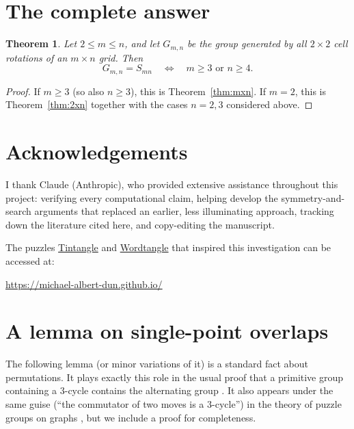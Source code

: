 \documentclass[11pt]{article}
\newtheorem{theorem}{Theorem}
\begin{document}
\section{The complete answer}

\begin{theorem}
Let $2\le m\le n$, and let $G_{m,n}$ be the group generated by all $2\times2$ cell rotations of an $m\times n$ grid. Then
\[
G_{m,n} = S_{mn} \quad\Longleftrightarrow\quad m\ge3 \text{ or } n\ge4.
\]
\end{theorem}
\begin{proof}
If $m\ge3$ (so also $n\ge3$), this is Theorem~\ref{thm:mxn}. If $m=2$, this is Theorem~\ref{thm:2xn} together with the cases $n = 2,3$ considered above.
\end{proof}

\section*{Acknowledgements}

I thank Claude (Anthropic), who provided extensive assistance throughout this project: verifying every computational claim, helping develop the symmetry-and-search arguments that replaced an earlier, less illuminating approach, tracking down the literature cited here, and copy-editing the manuscript.

The puzzles \href{https://michael-albert-dun.github.io/tintangle}{Tintangle} and \href{https://michael-albert-dun.github.io/wordtangle}{Wordtangle} that inspired this investigation can be accessed at:
\begin{center}
\url{https://michael-albert-dun.github.io/}
\end{center}

\appendix
\renewcommand{\thesection}{Appendix \Alph{section}}

\section{A lemma on single-point overlaps}\label{app:single-point-overlaps}

The following lemma (or minor variations of it) is a standard fact about permutations. It plays exactly this role in the usual proof that a primitive group containing a $3$-cycle contains the alternating group \cite{DixonMortimer1996}. It also appears under the same guise (``the commutator of two moves is a $3$-cycle'') in the theory of puzzle groups on graphs \cite{Wilson1974}, but we include a proof for completeness.
\end{document}
